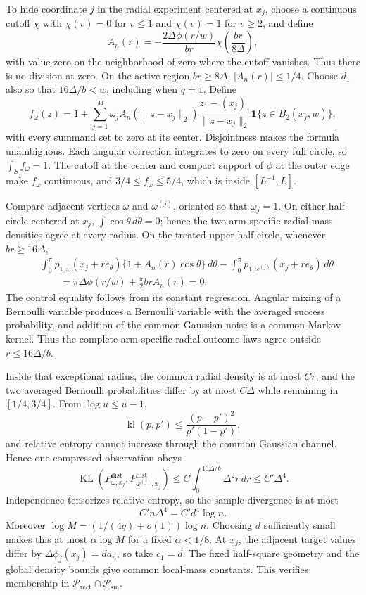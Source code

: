 To hide coordinate \(j\) in the radial experiment centered at \(x_j\), choose a continuous cutoff \(\chi\) with \(\chi(v)=0\) for \(v\leq1\) and \(\chi(v)=1\) for \(v\geq2\), and define
\[
 A_n(r)=-\frac{2\Delta\phi(r/w)}{br}
 \chi\!\left(\frac{br}{8\Delta}\right),
\]
with value zero on the neighborhood of zero where the cutoff vanishes.  Thus there is no division at zero.  On the active region \(br\geq8\Delta\), \(|A_n(r)|\leq1/4\).  Choose \(d_1\) also so that \(16\Delta/b<w\), including when \(q=1\).  Define
\[
 f_\omega(z)=1+\sum_{j=1}^M\omega_jA_n(\lVert z-x_j\rVert_2)
 \frac{z_1-(x_j)_1}{\lVert z-x_j\rVert_2}
 \mathbf1\{z\in B_2(x_j,w)\},
\]
with every summand set to zero at its center.  Disjointness makes the formula unambiguous.  Each angular correction integrates to zero on every full circle, so \(\int_Sf_\omega=1\).  The cutoff at the center and compact support of \(\phi\) at the outer edge make \(f_\omega\) continuous, and \(3/4\leq f_\omega\leq5/4\), which is inside \([L^{-1},L]\).

Compare adjacent vertices \(\omega\) and \(\omega^{(j)}\), oriented so that \(\omega_j=1\).  On either half-circle centered at \(x_j\), \(\int\cos\theta\,d\theta=0\); hence the two arm-specific radial mass densities agree at every radius.  On the treated upper half-circle, whenever \(br\geq16\Delta\),
\[
\begin{aligned}
 &\int_0^\pi p_{1,\omega}(x_j+r e_\theta)
       \{1+A_n(r)\cos\theta\}\,d\theta
 -\int_0^\pi p_{1,\omega^{(j)}}(x_j+r e_\theta)\,d\theta\\
 &\qquad=\pi\Delta\phi(r/w)+\frac\pi2brA_n(r)=0.
\end{aligned}
\]
The control equality follows from its constant regression.  Angular mixing of a Bernoulli variable produces a Bernoulli variable with the averaged success probability, and addition of the common Gaussian noise is a common Markov kernel.  Thus the complete arm-specific radial outcome laws agree outside \(r\leq16\Delta/b\).

Inside that exceptional radius, the common radial density is at most \(Cr\), and the two averaged Bernoulli probabilities differ by at most \(C\Delta\) while remaining in \([1/4,3/4]\).  From \(\log u\leq u-1\),
\[
 \operatorname{kl}(p,p')\leq\frac{(p-p')^2}{p'(1-p')},
\]
and relative entropy cannot increase through the common Gaussian channel.  Hence one compressed observation obeys
\[
 \operatorname{KL}(P^{\mathrm{dist}}_{\omega,x_j},
 P^{\mathrm{dist}}_{\omega^{(j)},x_j})
 \leq C\int_0^{16\Delta/b}\Delta^2r\,dr
 \leq C'\Delta^4.
\]
Independence tensorizes relative entropy, so the sample divergence is at most
\[
 C'n\Delta^4=C'd^4\log n.
\]
Moreover \(\log M=(1/(4q)+o(1))\log n\).  Choosing \(d\) sufficiently small makes this at most \(\alpha\log M\) for a fixed \(\alpha<1/8\).  At \(x_j\), the adjacent target values differ by \(\Delta\phi_j(x_j)=d a_n\), so take \(c_1=d\).  The fixed half-square geometry and the global density bounds give common local-mass constants.  This verifies membership in \(\mathcal P_{\mathrm{rect}}\cap\mathcal P_{\mathrm{sm}}\).

